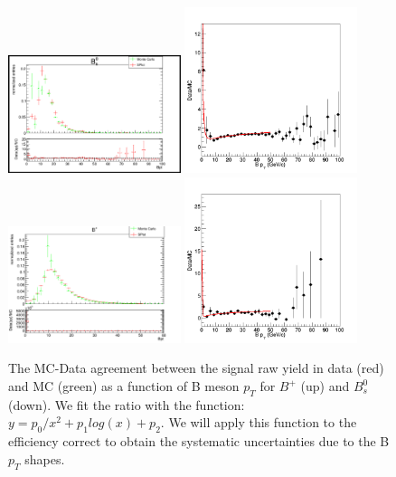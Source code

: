 \begin{figure}[h]
\begin{center}
\includegraphics[width= 0.45\textwidth]{Plots/MCReweight/Bpt/BPPtDataMC.png}
\includegraphics[width= 0.45\textwidth]{Plots/MCReweight/Bpt/BPPtWeight.png}
\includegraphics[width= 0.45\textwidth]{Plots/MCReweight/Bpt/BsPtDataMC.png}
\includegraphics[width= 0.45\textwidth]{Plots/MCReweight/Bpt/BsPtWeight.png}
\caption{The MC-Data agreement between the signal raw yield in data (red) and MC (green) as a function of B meson $p_{T}$ for $B^{+}$ (up) and $B^0_s$ (down). We fit the ratio with the function: $y = p_0/x^2 + p_1 log(x) + p_2$. We will apply this function to the efficiency correct to obtain the systematic uncertainties due to the B $p_T$ shapes.}
\label{fig:BptReweightShape}
\end{center}
\end{figure}


